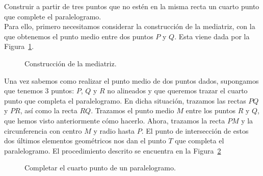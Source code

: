 \begin{ejercicio}
    Construir a partir de tres puntos que no estén en la misma recta un cuarto punto que complete el paralelogramo.\\

    \noindent
    Para ello, primero necesitamos considerar la construcción de la mediatriz, con la que obtenemos el punto medio entre dos puntos $P$ y $Q$. Esta viene dada por la Figura~\ref{fig:mediatriz}.
    \begin{figure}
        \centering
        \caption{Construcción de la mediatriz.}
        \label{fig:mediatriz}
    \end{figure}
    Una vez sabemos como realizar el punto medio de dos puntos dados, supongamos que tenemos 3 puntos: $P$, $Q$ y $R$ no alineados y que queremos trazar el cuarto punto que completa el paralelogramo. En dicha situación, trazamos las rectas $PQ$ y $PR$, así como la recta $RQ$. Trazamos el punto medio $M$ entre los puntos $R$ y $Q$, que hemos visto anteriormente cómo hacerlo. Ahora, trazamos la recta $PM$ y la circunferencia con centro $M$ y radio hasta $P$. El punto de intersección de estos dos últimos elementos geométricos nos dan el punto $T$ que completa el paralelogramo. El procedimiento descrito se encuentra en la Figura~\ref{fig:paralelogramo}
    \begin{figure}
        \centering
        \caption{Completar el cuarto punto de un paralelogramo.}
        \label{fig:paralelogramo}
    \end{figure}
\end{ejercicio}

